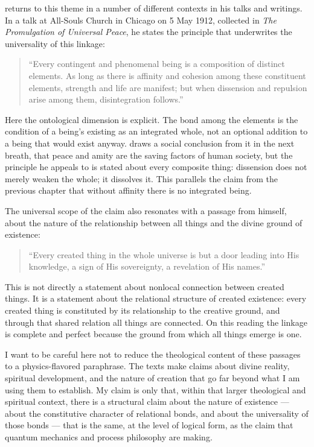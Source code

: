 \AbdulBaha returns to this theme in a number of different contexts in his talks and writings. In a talk at All-Souls Church in Chicago on 5 May 1912, collected in \emph{The Promulgation of Universal Peace}, he states the principle that underwrites the universality of this linkage:

\begin{quote}
``Every contingent and phenomenal being is a composition of distinct elements. As long as there is affinity and cohesion among these constituent elements, strength and life are manifest; but when dissension and repulsion arise among them, disintegration follows.''
\citep[Talk 41]{PUP}
\end{quote}

Here the ontological dimension is explicit. The bond among the elements is the condition of a being's existing as an integrated whole, not an optional addition to a being that would exist anyway. \AbdulBaha draws a social conclusion from it in the next breath, that peace and amity are the saving factors of human society, but the principle he appeals to is stated about every composite thing: dissension does not merely weaken the whole; it dissolves it. This parallels the claim from the previous chapter that without affinity there is no integrated being.

The universal scope of the \bahai claim also resonates with a passage from \Bahaullah himself, about the nature of the relationship between all things and the divine ground of existence:

\begin{quote}
``Every created thing in the whole universe is but a door leading into His knowledge, a sign of His sovereignty, a revelation of His names.''
\citep[Gleanings LXXXII]{GleaningsBahaullah} %
\end{quote}

This is not directly a statement about nonlocal connection between created things. It is a statement about the relational structure of created existence: every created thing is constituted by its relationship to the creative ground, and through that shared relation all things are connected. On this reading the linkage is complete and perfect because the ground from which all things emerge is one.

I want to be careful here not to reduce the theological content of these passages to a physics-flavored paraphrase. The \bahai texts make claims about divine reality, spiritual development, and the nature of creation that go far beyond what I am using them to establish. My claim is only that, within that larger theological and spiritual context, there is a structural claim about the nature of existence --- about the constitutive character of relational bonds, and about the universality of those bonds --- that is the same, at the level of logical form, as the claim that quantum mechanics and process philosophy are making.


